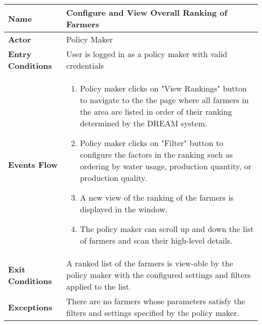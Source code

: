 
\begin{center}
\begin{tabular}{|l|>{\raggedright\arraybackslash}m{12cm}|}

    \hline
    \textbf{Name} & Configure and View Overall Ranking of Farmers\\
    \hline
   	\textbf{Actor} & Policy Maker\\
    \hline
    \textbf{Entry Conditions} & User is logged in as a policy maker with valid credentials\\
    \hline
    \textbf{Events Flow} & 
    \begin{enumerate}
   	\item Policy maker clicks on "View Rankings" button to navigate to the the page where all farmers in the area are listed in order of their ranking determined by the DREAM system. 
    	\item Policy maker clicks on "Filter" button to configure the factors in the ranking such as ordering by water usage, production quantity, or production quality. 
    	\item A new view of the ranking of the farmers is displayed in the window. 
    	\item The policy maker can scroll up and down the list of farmers and scan their high-level details.
    \end{enumerate} \\ \hline
    \textbf{Exit Conditions} & A ranked list of the farmers is view-able by the policy maker with the configured settings and filters applied to the list.\\
    \hline
    \textbf{Exceptions} & There are no farmers whose parameters satisfy the filters and settings specified by the policy maker.\\
    \hline
\end{tabular}
\end{center}